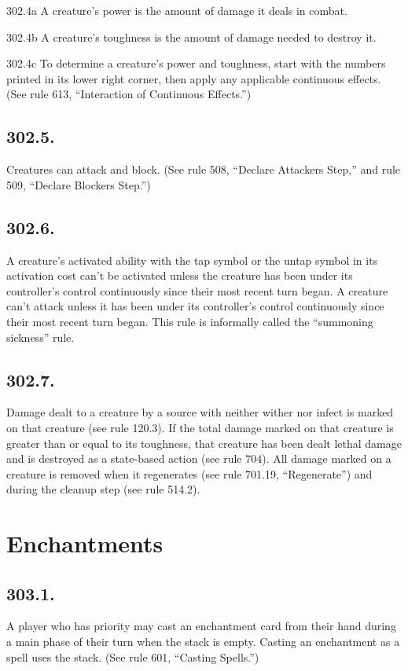 302.4a A creature’s power is the amount of damage it deals in combat.

302.4b A creature’s toughness is the amount of damage needed to destroy it.

302.4c To determine a creature’s power and toughness, start with the numbers printed in its lower right corner, then apply any applicable continuous effects. (See rule 613, “Interaction of Continuous Effects.”)

\subsection*{302.5.}
Creatures can attack and block. (See rule 508, “Declare Attackers Step,” and rule 509, “Declare Blockers Step.”)

\subsection*{302.6.}
A creature’s activated ability with the tap symbol or the untap symbol in its activation cost can’t be activated unless the creature has been under its controller’s control continuously since their most recent turn began. A creature can’t attack unless it has been under its controller’s control continuously since their most recent turn began. This rule is informally called the “summoning sickness” rule.

\subsection*{302.7.}
Damage dealt to a creature by a source with neither wither nor infect is marked on that creature (see rule 120.3). If the total damage marked on that creature is greater than or equal to its toughness, that creature has been dealt lethal damage and is destroyed as a state-based action (see rule 704). All damage marked on a creature is removed when it regenerates (see rule 701.19, “Regenerate”) and during the cleanup step (see rule 514.2).

\section{Enchantments}
\subsection*{303.1.}
A player who has priority may cast an enchantment card from their hand during a main phase of their turn when the stack is empty. Casting an enchantment as a spell uses the stack. (See rule 601, “Casting Spells.”)

